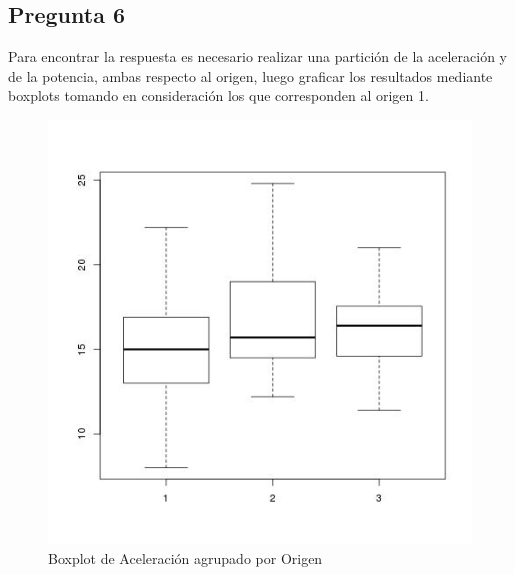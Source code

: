 \documentclass[letter,10pt]{article}
\begin{document}
\newpage
\subsection{Pregunta 6}

Para encontrar la respuesta es necesario realizar una partición de la aceleración y de la potencia, ambas respecto al origen, luego graficar los resultados
mediante boxplots tomando en consideración los que corresponden al origen 1.

  \begin{minipage}{\linewidth}
      \centering
      \begin{minipage}{0.45\linewidth}
          \begin{figure}[H]
              \includegraphics[width=\linewidth]{boxplot_acceleration_origin.jpg}
              \caption{Boxplot de Aceleración agrupado por Origen}
          \end{figure}
      \end{minipage}
      \hspace{0.05\linewidth}
      \begin{minipage}{0.45\linewidth}
          \begin{figure}[H]

\end{figure}
\end{minipage}
\end{minipage}
\end{document}
